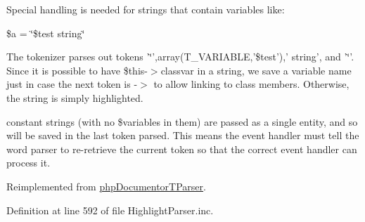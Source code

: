 \-Special handling is needed for strings that contain variables like\-:

{\ttfamily \$a = \char`\"{}\$test string\char`\"{}}

\-The tokenizer parses out tokens '\char`\"{}',array(\-T\-\_\-\-V\-A\-R\-I\-A\-B\-L\-E,'\$test'),' string', and '\char`\"{}'. \-Since it is possible to have \$this-\/$>$classvar in a string, we save a variable name just in case the next token is -\/$>$ to allow linking to class members. \-Otherwise, the string is simply highlighted.

constant strings (with no \$variables in them) are passed as a single entity, and so will be saved in the last token parsed. \-This means the event handler must tell the word parser to re-\/retrieve the current token so that the correct event handler can process it. 

\-Reimplemented from \hyperlink{classphp_documentor_t_parser_a4ba20cc549548714f50dafced3b6ec71}{php\-Documentor\-T\-Parser}.



\-Definition at line 592 of file \-Highlight\-Parser.\-inc.


